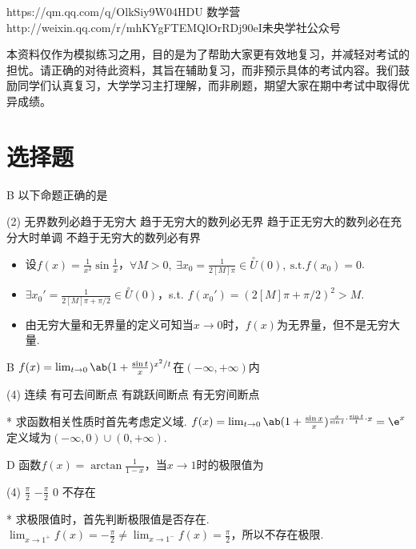 {https://qm.qq.com/q/OlkSiy9W04}{HDU 数学营}
{http://weixin.qq.com/r/mhKYgFTEMQlOrRDj90eI}{未央学社公众号}
\begin{flushleft}
    \kaishu\qquad 本资料仅作为模拟练习之用，目的是为了帮助大家更有效地复习，并减轻对考试的担忧。请正确的对待此资料，其旨在辅助复习，而非预示具体的考试内容。我们鼓励同学们认真复习，大学学习主打理解，而非刷题，期望大家在期中考试中取得优异成绩。
\end{flushleft}

\section{选择题}
\begin{choice}{B}
    以下命题正确的是
\begin{tasks}(2)
    \task 无界数列必趋于无穷大
    \task 趋于无穷大的数列必无界
    \task 趋于正无穷大的数列必在充分大时单调
    \task 不趋于无穷大的数列必有界
\end{tasks}
\end{choice}
\begin{solution}
\begin{itemize}
    \item 设$f(x)=\frac{1}{x^2}\sin\frac1x$，$\forall M>0,\ \exists x_0=\frac{1}{2[M]\pi}\in \overset{\circ}{U}(0),\ \text{s.t.}f(x_0)=0$.
    \item $\exists x_0'=\frac{1}{2[M]\pi+\pi/2}\in\overset{\circ}{U}(0)$，s.t. $f(x_0')=(2[M]\pi+\pi/2)^2>M$.
    \item 由无穷大量和无界量的定义可知当$x\to 0$时，$f(x)$为无界量，但不是无穷大量.
\end{itemize}
\end{solution}

\begin{choice}{B}
    $f(x)=\lim_{t\to 0}\ab(1+\frac{\sin t}{x})^{x^2/t}$在$(-\infty,+\infty)$内
\begin{tasks}(4)
    \task 连续
    \task 有可去间断点
    \task 有跳跃间断点
    \task 有无穷间断点
\end{tasks}
\end{choice}
\begin{solution}*
    求函数相关性质时首先考虑定义域. $f(x)=\lim_{t\to 0}\ab(1+\frac{\sin x}{x})^{\frac{x}{\sin t}\cdot\frac{\sin t}{t}\cdot x}=\e^x$定义域为$(-\infty,0)\cup (0,+\infty)$.
\end{solution}

\begin{choice}{D}
    函数$f(x)=\arctan\frac{1}{1-x}$，当$x\to 1$时的极限值为
\begin{tasks}(4)
    \task $\frac\pi2$
    \task $-\frac\pi2$
    \task $0$
    \task 不存在
\end{tasks}
\end{choice}
\begin{solution}*
    求极限值时，首先判断极限值是否存在. $\lim_{x\to 1^+}f(x)=-\frac\pi2\neq\lim_{x\to 1^-}f(x)=\frac\pi2$，所以不存在极限.
\end{solution}

